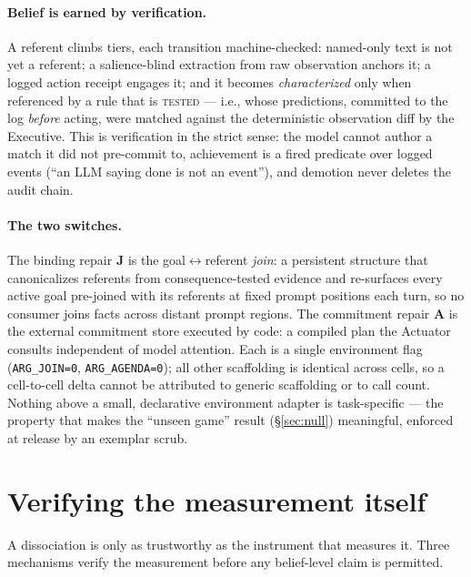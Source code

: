 \documentclass{article}
\begin{document}
\paragraph{Belief is earned by verification.} A referent climbs tiers, each
transition machine-checked: named-only text is not yet a referent; a
salience-blind extraction from raw observation anchors it; a logged action receipt
engages it; and it becomes \emph{characterized} only when referenced by a rule
that is \textsc{tested} --- i.e., whose predictions, committed to the log
\emph{before} acting, were matched against the deterministic observation diff by
the Executive. This is verification in the strict sense: the model cannot author a
match it did not pre-commit to, achievement is a fired predicate over logged
events (``an LLM saying done is not an event''), and demotion never deletes the
audit chain.

\paragraph{The two switches.} The binding repair \textbf{J} is the
goal$\leftrightarrow$referent \emph{join}: a persistent structure that
canonicalizes referents from consequence-tested evidence and re-surfaces every
active goal pre-joined with its referents at fixed prompt positions each turn, so
no consumer joins facts across distant prompt regions. The commitment repair
\textbf{A} is the external commitment store executed by code: a compiled plan the
Actuator consults independent of model attention. Each is a single environment
flag (\texttt{ARG\_JOIN=0}, \texttt{ARG\_AGENDA=0}); all other scaffolding is
identical across cells, so a cell-to-cell delta cannot be attributed to generic
scaffolding or to call count. Nothing above a small, declarative environment
adapter is task-specific --- the property that makes the ``unseen game'' result
(\S\ref{sec:null}) meaningful, enforced at release by an exemplar scrub.

\section{Verifying the measurement itself}
\label{sec:verif}

A dissociation is only as trustworthy as the instrument that measures it. Three
mechanisms verify the measurement before any belief-level claim is permitted.
\end{document}
